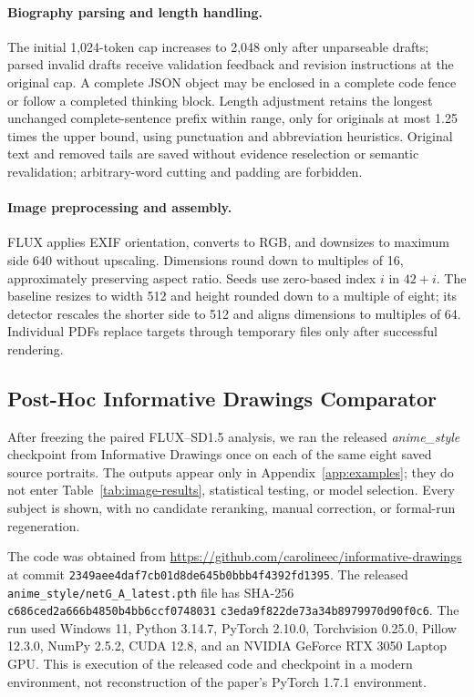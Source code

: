 \paragraph{Biography parsing and length handling.}
The initial 1,024-token cap increases to 2,048 only after unparseable drafts; parsed invalid drafts receive validation feedback and revision instructions at the original cap. A complete JSON object may be enclosed in a complete code fence or follow a completed thinking block. Length adjustment retains the longest unchanged complete-sentence prefix within range, only for originals at most 1.25 times the upper bound, using punctuation and abbreviation heuristics. Original text and removed tails are saved without evidence reselection or semantic revalidation; arbitrary-word cutting and padding are forbidden.

\paragraph{Image preprocessing and assembly.}
FLUX applies EXIF orientation, converts to RGB, and downsizes to maximum side 640 without upscaling. Dimensions round down to multiples of 16, approximately preserving aspect ratio. Seeds use zero-based index $i$ in $42+i$. The baseline resizes to width 512 and height rounded down to a multiple of eight; its detector rescales the shorter side to 512 and aligns dimensions to multiples of 64. Individual PDFs replace targets through temporary files only after successful rendering.

\subsection{Post-Hoc Informative Drawings Comparator}

After freezing the paired FLUX--SD1.5 analysis, we ran the released
\emph{anime\_style} checkpoint from Informative Drawings
\citep{chan-etal-2022-informative-drawings} once on each of the same eight
saved source portraits. The outputs appear only in
Appendix~\ref{app:examples}; they do not enter
Table~\ref{tab:image-results}, statistical testing, or model selection. Every
subject is shown, with no candidate reranking, manual correction, or formal-run
regeneration.

The code was obtained from
\url{https://github.com/carolineec/informative-drawings} at commit
\nolinkurl{2349aee4daf7cb01d8de645b0bbb4f4392fd1395}. The released
\nolinkurl{anime_style/netG_A_latest.pth} file has SHA-256
\nolinkurl{c686ced2a666b4850b4bb6ccf0748031}\allowbreak
\nolinkurl{c3eda9f822de73a34b8979970d90f0c6}.
The run used Windows 11, Python 3.14.7, PyTorch 2.10.0, Torchvision 0.25.0,
Pillow 12.3.0, NumPy 2.5.2, CUDA 12.8, and an NVIDIA GeForce RTX 3050
Laptop GPU. This is execution of the released code and checkpoint in a modern
environment, not reconstruction of the paper's PyTorch 1.7.1 environment.

